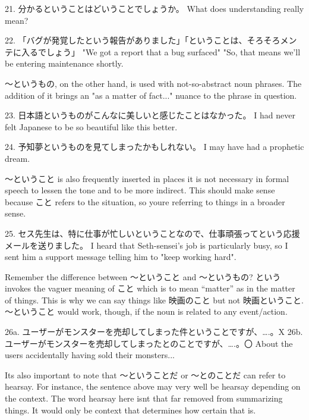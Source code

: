 \par{21. 分かるということはどいうことでしょうか。 \hfill\break
What does understanding really mean? }

\par{22. 「バグが発覚したという報告がありました」「ということは、そろそろメンテに入るでしょう」 \hfill\break
"We got a report that a bug surfaced" "So, that means we'll be entering maintenance shortly. }

\par{ ～というもの, on the other hand, is used with not-so-abstract noun phrases. The addition of it brings an "as a matter of fact\dothyp{}\dothyp{}\dothyp{}" nuance to the phrase in question. }

\par{23. 日本語というものがこんなに美しいと感じたことはなかった。 \hfill\break
I had never felt Japanese to be so beautiful like this better. }

\par{24. 予知夢というものを見てしまったかもしれない。 \hfill\break
I may have had a prophetic dream.  }

\par{ ～ということ is also frequently inserted in places it is not necessary in formal speech to lessen the tone and to be more indirect. This should make sense because こと refers to the situation, so you\textquotesingle re referring to things in a broader sense. }

\par{25. セス先生は、特に仕事が忙しいということなので、仕事頑張ってという応援メールを送りました。 \hfill\break
I heard that Seth-sensei's job is particularly busy, so I sent him a support message telling him to "keep working hard". }

\par{ Remember the difference between ～ということ and ～というもの? という invokes the vaguer meaning of こと which is to mean “matter” as in the matter of things. This is why we can say things like 映画のこと but not 映画ということ. ～ということ would work, though, if the noun is related to any event\slash action. }

\par{26a. ユーザーがモンスターを売却してしまった件ということですが、….。X \hfill\break
26b. ユーザーがモンスターを売却してしまったとのことですが、….。〇 \hfill\break
About the users accidentally having sold their monsters\dothyp{}\dothyp{}\dothyp{} }

\par{ It\textquotesingle s also important to note that ～ということだ or ～とのことだ can refer to hearsay. For instance, the sentence above may very well be hearsay depending on the context. The word hearsay here isn\textquotesingle t that far removed from summarizing things. It would only be context that determines how certain that is. }

